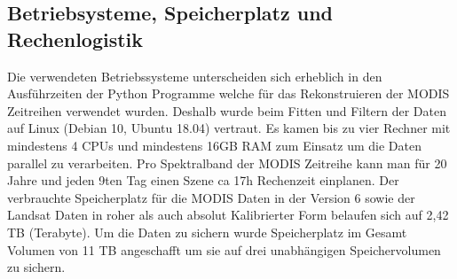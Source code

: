 \documentclass[11pt]{report}
\begin{document}
\subsection{Betriebsysteme, Speicherplatz und Rechenlogistik}
Die verwendeten Betriebssysteme unterscheiden sich erheblich in den Ausführzeiten der Python Programme welche für das Rekonstruieren der MODIS Zeitreihen verwendet wurden. Deshalb wurde beim Fitten und Filtern der Daten auf Linux (Debian 10, Ubuntu 18.04) vertraut. Es kamen bis zu vier Rechner mit mindestens 4 CPUs und mindestens 16GB RAM zum Einsatz um die Daten parallel zu verarbeiten. Pro Spektralband der MODIS Zeitreihe kann man für 20 Jahre und jeden 9ten Tag einen Szene ca 17h Rechenzeit einplanen. Der verbrauchte Speicherplatz für die MODIS Daten in der Version 6 sowie der Landsat Daten in roher als auch absolut Kalibrierter Form belaufen sich auf 2,42 TB (Terabyte). Um die Daten zu sichern wurde Speicherplatz im Gesamt Volumen von 11 TB angeschafft um sie auf drei unabhängigen Speichervolumen zu sichern. 
\end{document}
